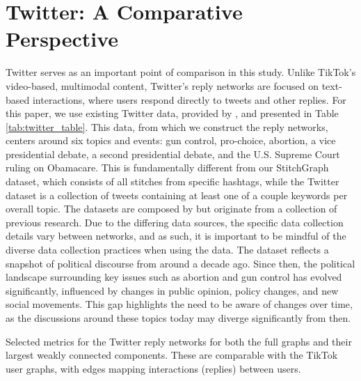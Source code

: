 \section{Twitter: A Comparative Perspective}\label{twitter_data_and_material}

Twitter serves as an important point of comparison in this study. Unlike TikTok’s video-based, multimodal content, Twitter’s reply networks are focused on text-based interactions, where users respond directly to tweets and other replies. For this paper, we use existing Twitter data, provided by \cite{doi:10.1126/sciadv.abq2044}, and presented in Table \ref{tab:twitter_table}. This data, from which we construct the reply networks, centers around six topics and events: gun control, pro-choice, abortion, a vice presidential debate, a second presidential debate, and the U.S. Supreme Court ruling on Obamacare. This is fundamentally different from our StitchGraph dataset, which consists of all stitches from specific hashtags, while the Twitter dataset is a collection of tweets containing at least one of a couple keywords per overall topic. The datasets are composed by \cite{doi:10.1126/sciadv.abq2044} but originate from a collection of previous research. Due to the differing data sources, the specific data collection details vary between networks, and as such, it is important to be mindful of the diverse data collection practices when using the data. The dataset reflects a snapshot of political discourse from around a decade ago. Since then, the political landscape surrounding key issues such as abortion and gun control has evolved significantly, influenced by changes in public opinion, policy changes, and new social movements. This gap highlights the need to be aware of changes over time, as the discussions around these topics today may diverge significantly from then.

\begin{table}[h]
    \centering
    \begin{adjustwidth}{-\textwidth}{-\textwidth}
        \centering
        
    \end{adjustwidth}
    \caption{Selected metrics for the Twitter reply networks for both the full graphs and their largest weakly connected components. These are comparable with the TikTok user graphs, with edges mapping interactions (replies) between users.}
    \label{tab:twitter_table}
\end{table}

